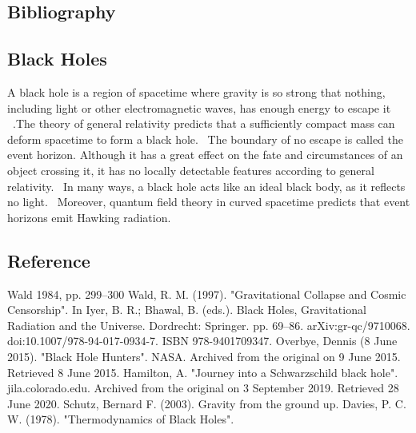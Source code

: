 \documentclass[12pt]{article}
\begin{document}
\begin{large}
\section{Bibliography}
\subsection{Black Holes}
A black hole is a region of spacetime where gravity is so strong that nothing, including light or other electromagnetic waves, has enough energy to escape it ~\cite{1}.The theory of general relativity predicts that a sufficiently compact mass can deform spacetime to form a black hole.~\cite{2, 3} The boundary of no escape is called the event horizon. Although it has a great effect on the fate and circumstances of an object crossing it, it has no locally detectable features according to general relativity.~\cite{4} In many ways, a black hole acts like an ideal black body, as it reflects no light.~\cite{5, 6} Moreover, quantum field theory in curved spacetime predicts that event horizons emit Hawking radiation.
\subsection{Reference}
\begin{thebibliography} {}
 Wald 1984, pp. 299–300
 Wald, R. M. (1997). "Gravitational Collapse and Cosmic Censorship". In Iyer, B. R.; Bhawal, B. (eds.). Black Holes, Gravitational Radiation and the Universe. Dordrecht: Springer. pp. 69–86. arXiv:gr-qc/9710068. doi:10.1007/978-94-017-0934-7. ISBN 978-9401709347.
 Overbye, Dennis (8 June 2015). "Black Hole Hunters". NASA. Archived from the original on 9 June 2015. Retrieved 8 June 2015.
 Hamilton, A. "Journey into a Schwarzschild black hole". jila.colorado.edu. Archived from the original on 3 September 2019. Retrieved 28 June 2020.
 Schutz, Bernard F. (2003). Gravity from the ground up.
 Davies, P. C. W. (1978). "Thermodynamics of Black Holes".
\end{thebibliography}
\end{large}
\pagebreak
\end{document}
